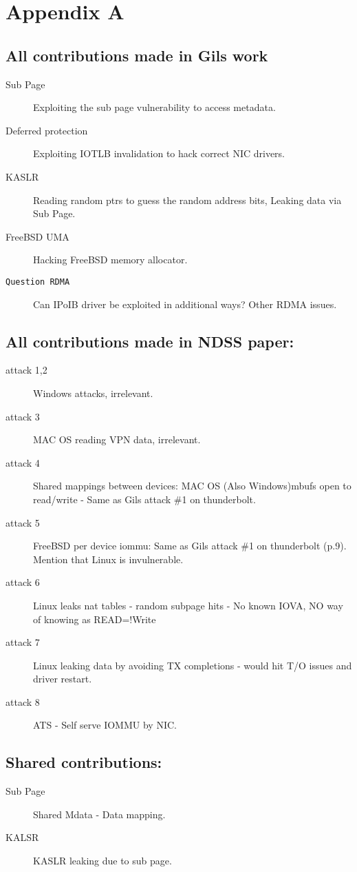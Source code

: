 \section{Appendix A}

\subsection{All contributions made in Gils work \cite{gil}}

\begin{description}
  
\item[Sub Page] Exploiting the sub page vulnerability to access metadata.
\item[Deferred protection] Exploiting IOTLB invalidation to hack correct NIC drivers.
\item[KASLR] Reading random ptrs to guess the random address bits, Leaking data via Sub Page.
\item[FreeBSD UMA] Hacking FreeBSD memory allocator.
\item[\texttt{Question RDMA}] Can IPoIB driver be exploited in additional ways? Other RDMA issues.
\end{description}

\subsection{All contributions made in NDSS paper\cite{thunder}:}
\begin{description}
\item[attack 1,2] Windows attacks, irrelevant.
\item[attack 3] MAC OS reading VPN data, irrelevant.
\item[attack 4] Shared mappings between devices: MAC OS (Also Windows)mbufs open to read/write - Same as Gils  attack \#1 on thunderbolt.
\item[attack 5] FreeBSD per device iommu:  Same as Gils  attack \#1 on thunderbolt (p.9). Mention that Linux is invulnerable.
\item[attack 6] Linux leaks nat tables - random subpage hits - No known IOVA, NO way of knowing as READ=!Write
\item[attack 7] Linux leaking data by avoiding TX completions - would hit T/O issues and driver restart.
\item[attack 8] ATS - Self serve IOMMU by NIC. 
\end{description}

\subsection{Shared contributions:}
\begin{description}
\item[Sub Page] Shared Mdata - Data mapping.
\item[KALSR] KASLR leaking due to sub page.
\end{description}

